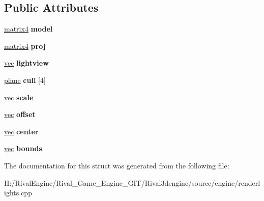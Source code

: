 \subsection*{Public Attributes}
\begin{DoxyCompactItemize}
\item 
\mbox{\label{structreflectiveshadowmap_a68cc104e9102d326299cd57ade2a7f5f}} 
\hyperlink{structmatrix4}{matrix4} {\bfseries model}
\item 
\mbox{\label{structreflectiveshadowmap_af9890ee2ff7fdcb3bb5e6790b26485e1}} 
\hyperlink{structmatrix4}{matrix4} {\bfseries proj}
\item 
\mbox{\label{structreflectiveshadowmap_ab42da875fed40f79d7dfc276e25747dc}} 
\hyperlink{structvec}{vec} {\bfseries lightview}
\item 
\mbox{\label{structreflectiveshadowmap_a9affdef67f5f5da0676e687a8987ec73}} 
\hyperlink{structplane}{plane} {\bfseries cull} \mbox{[}4\mbox{]}
\item 
\mbox{\label{structreflectiveshadowmap_ab1a0ec4af64752d20e1ab867cf517f4b}} 
\hyperlink{structvec}{vec} {\bfseries scale}
\item 
\mbox{\label{structreflectiveshadowmap_a02edba10b6523defbffa2ef15612290c}} 
\hyperlink{structvec}{vec} {\bfseries offset}
\item 
\mbox{\label{structreflectiveshadowmap_a8836bdab948056ab9e9eda72100db6e5}} 
\hyperlink{structvec}{vec} {\bfseries center}
\item 
\mbox{\label{structreflectiveshadowmap_a9e923b244f6f8139a1df19ed9e6f1c7c}} 
\hyperlink{structvec}{vec} {\bfseries bounds}
\end{DoxyCompactItemize}


The documentation for this struct was generated from the following file\+:\begin{DoxyCompactItemize}
\item 
H\+:/\+Rival\+Engine/\+Rival\+\_\+\+Game\+\_\+\+Engine\+\_\+\+G\+I\+T/\+Rival3dengine/source/engine/renderlights.\+cpp\end{DoxyCompactItemize}
